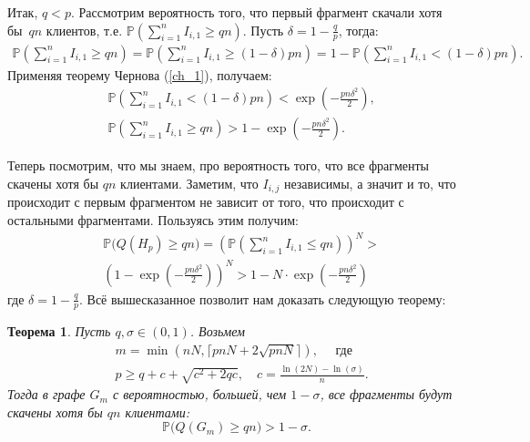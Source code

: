 \documentclass{matmex-diploma-custom}
\newcommand{\PRob}{\mathbb P}
\newcommand{\leqs}{\leqslant}
\newcommand{\geqs}{\geqslant}
\newtheorem{theorem}{Теорема}
\theoremstyle{named}
\begin{document}
Итак, $q < p$. Рассмотрим вероятность того, что первый фрагмент скачали хотя бы~$qn$ клиентов, 
т.е. $\PRob\left(\sum\limits_{i=1}^n I_{i,1} \geqs qn\right)$. Пусть $\delta = 1 - \frac{q}{p}$, тогда:
\begin{align*}
\PRob\left(\sum_{i=1}^n I_{i,1} \geqs qn\right) = \PRob\left(\sum_{i=1}^n I_{i,1} \geqs (1 - \delta) pn\right) 
= 1 - \PRob\left(\sum_{i=1}^n I_{i,1} < (1 - \delta) pn\right).
\end{align*}
Применяя теорему Чернова (\ref{ch_1}), получаем:
\begin{align}
&\PRob\left(\sum_{i=1}^n I_{i,1} < (1 - \delta) pn\right) < \exp\left(- \frac{pn \delta^2}{2} \right),
\\
&\PRob\left(\sum_{i=1}^n I_{i,1} \geqs qn\right) > 1 - \exp\left(- \frac{pn \delta^2}{2} \right).
\end{align}

Теперь посмотрим, что мы знаем, про вероятность того, что все фрагменты скачены хотя бы $qn$ клиентами.
Заметим, что $I_{i,j}$ независимы, а значит и то, что происходит с первым фрагментом не зависит от того, 
что происходит с остальными фрагментами. Пользуясь этим получим:
\begin{equation}\label{mod1_pr}\begin{aligned}
&\PRob\big(Q(H_p) \geqs q n\big) = \left( \PRob\left(\sum_{i=1}^n I_{i,1} \leqs qn\right)  \right)^N >
\\
&\left( 1 - \exp\left(- \frac{pn \delta^2}{2} \right) \right)^N > 1 - N \cdot \exp\left(- \frac{pn \delta^2}{2} \right) 
\end{aligned}\end{equation}
где $\delta = 1 - \frac{q}{p}$. Всё вышесказанное позволит нам доказать следующую теорему:

\begin{theorem}\label{t1}
Пусть $q, \sigma \in (0, 1)$. Возьмем 
\begin{align}
& m = \min(nN, \lceil pnN + 2\sqrt{pnN} \rceil), \quad \text{ где} \\
& p \geqs q + c + \sqrt{c^2+2qc}, \quad c = \frac{\ln(2N) - \ln(\sigma)}{n}.
\end{align}
Тогда в графе $G_m$ с вероятностью, большей, чем $1 - \sigma$, все фрагменты будут скачены хотя бы $qn$ клиентами:
\begin{equation}
\PRob\big(Q(G_m) \geqs qn\big) > 1 - \sigma.
\end{equation}
\end{theorem}
\end{document}
